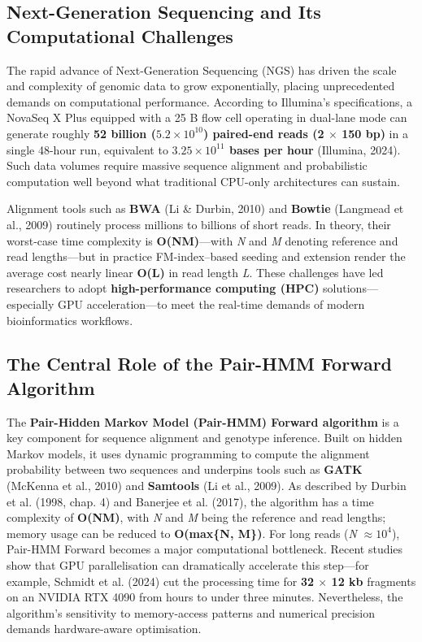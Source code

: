 \documentclass[PhD]{PHlab-thesis}
\begin{document}
\subsection{Next-Generation Sequencing and Its Computational Challenges}
The rapid advance of Next-Generation Sequencing (NGS) has driven the scale and complexity of genomic data to grow exponentially, placing unprecedented demands on computational performance. According to Illumina’s specifications, a NovaSeq X Plus equipped with a 25 B flow cell operating in dual-lane mode can generate roughly \textbf{52 billion ($5.2 \times 10^{10}$) paired-end reads (2 $\times$ 150 bp)} in a single 48-hour run, equivalent to \textbf{$3.25 \times 10^{11}$ bases per hour} (Illumina, 2024). Such data volumes require massive sequence alignment and probabilistic computation well beyond what traditional CPU-only architectures can sustain.

Alignment tools such as \textbf{BWA} (Li \& Durbin, 2010) and \textbf{Bowtie} (Langmead et al., 2009) routinely process millions to billions of short reads. In theory, their worst-case time complexity is \textbf{O(NM)}—with \emph{N} and \emph{M} denoting reference and read lengths—but in practice FM-index–based seeding and extension render the average cost nearly linear \textbf{O(L)} in read length \emph{L}. These challenges have led researchers to adopt \textbf{high-performance computing (HPC)} solutions—especially GPU acceleration—to meet the real-time demands of modern bioinformatics workflows.

\subsection{The Central Role of the Pair-HMM Forward Algorithm}
The \textbf{Pair-Hidden Markov Model (Pair-HMM) Forward algorithm} is a key component for sequence alignment and genotype inference. Built on hidden Markov models, it uses dynamic programming to compute the alignment probability between two sequences and underpins tools such as \textbf{GATK} (McKenna et al., 2010) and \textbf{Samtools} (Li et al., 2009). As described by Durbin et al. (1998, chap. 4) and Banerjee et al. (2017), the algorithm has a time complexity of \textbf{O(NM)}, with \emph{N} and \emph{M} being the reference and read lengths; memory usage can be reduced to \textbf{O(max\{N, M\})}. For long reads (\emph{N} $\approx 10^4$), Pair-HMM Forward becomes a major computational bottleneck. Recent studies show that GPU parallelisation can dramatically accelerate this step—for example, Schmidt et al. (2024) cut the processing time for \textbf{32 $\times$ 12 kb} fragments on an NVIDIA RTX 4090 from hours to under three minutes. Nevertheless, the algorithm’s sensitivity to memory-access patterns and numerical precision demands hardware-aware optimisation.
\end{document}
